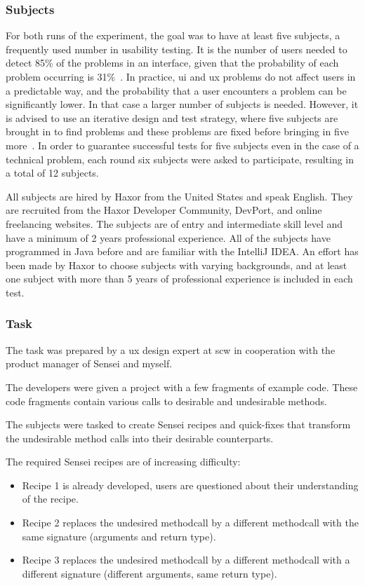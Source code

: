 \subsubsection{Subjects}
For both runs of the experiment, the goal was to have at least five subjects, a frequently used number in usability testing.
It is the number of users needed to detect 85\% of the problems in an interface, given that the probability of each problem occurring is 31\%~\cite{nielsen1993mathematical}.
In practice, \gls{ui} and \gls{ux} problems do not affect users in a predictable way, and the probability that a user encounters a problem can be significantly lower.
In that case a larger number of subjects is needed.
However, it is advised to use an iterative design and test strategy, where five subjects are brought in to find problems and these problems are fixed before bringing in five more~\cite{nielsen1993mathematical}.
In order to guarantee successful tests for five subjects even in the case of a technical problem, each round six subjects were asked to participate, resulting in a total of 12 subjects.

All subjects are hired by Haxor from the United States and speak English.
They are recruited from the Haxor Developer Community, DevPort, and online freelancing websites.
The subjects are of entry and intermediate skill level and have a minimum of 2 years professional experience.
All of the subjects have programmed in Java before and are familiar with the IntelliJ IDEA.
An effort has been made by Haxor to choose subjects with varying backgrounds, and at least one subject with more than 5 years of professional experience is included in each test.

\subsubsection{Task}
The task was prepared by a \gls{ux} design expert at \gls{scw} in cooperation with the product manager of Sensei and myself.

The developers were given a project with a few fragments of example code.
These code fragments contain various calls to desirable and undesirable methods.

The subjects were tasked to create Sensei recipes and quick-fixes that transform the undesirable method calls into their desirable counterparts.

The required Sensei recipes are of increasing difficulty:

\begin{itemize}[noitemsep]
    \item Recipe 1 is already developed, users are questioned about their understanding of the recipe.
    \item Recipe 2 replaces the undesired methodcall by a different methodcall with the same signature (arguments and return type).
    \item Recipe 3 replaces the undesired methodcall by a different methodcall with a different signature (different arguments, same return type).
\end{itemize}

